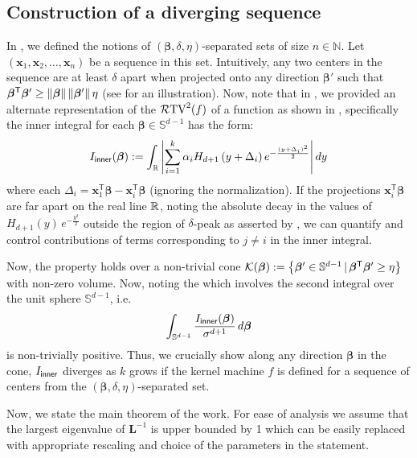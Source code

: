 \subsection{Construction of a diverging sequence}

In , we defined the notions of $(\bm{\beta}, \delta, \eta)$-separated sets of size $n \in \mathbb{N}$. Let $(\bm{x}_1,\bm{x}_2,\ldots,\bm{x}_n)$ be a sequence in this set. Intuitively, any two centers in the sequence are at least $\delta$ apart when projected onto any direction $\bm{\beta}'$ such that $\bm{\beta}^{\mathsf{T}}\bm{\beta}' \ge \norm{\bm{\beta}}\norm{\bm{\beta}'}\eta$ (see  for an illustration). Now, note that in , we provided an alternate representation of the $\rtv{f}$ of a function as shown in , specifically the inner integral for each $\bm{\beta} \in \mathbb{S}^{d-1}$ has the form:
$$I_{\sf{inner}}(\bm{\beta}) := \int_{\mathbb{R}} \left| \sum_{i=1}^k \alpha_i H_{d+1}\left( y + \Delta_i \right) e^{ -\frac{(y + \Delta_i)^2}{2} } \right| dy$$
where each $\Delta_i = \bm{x}_1^\mathsf{T}\bm{\beta} - \bm{x}_i^\mathsf{T}\bm{\beta}$ (ignoring the normalization). If the projections $\bm{x}_i^\mathsf{T}\bm{\beta}$ are far apart on the real line $\reals$, noting the absolute decay in the values of $H_{d+1}\left( y \right) \, e^{ -\frac{y^2}{2} }$ outside the region of $\delta$-peak as asserted by , we can quantify and control contributions of terms corresponding to $j \neq i$ in the inner integral. 

Now, the property holds over a non-trivial cone $\cK(\bm{\beta}) := \curlybracket{\bm{\beta}' \in \mathbb{S}^{d-1}\,|\, \bm{\beta}^{\mathsf{T}}\bm{\beta}' \ge \eta }$ with non-zero volume. Now, noting the  which involves the second integral over the unit sphere $\mathbb{S}^{d-1}$, i.e.
$$\int_{\mathbb{S}^{d-1}} \frac{I_{\sf{inner}}(\bm{\beta})}{\sigma^{d+1}} \, d\bm{\beta}$$
is non-trivially positive. Thus, we crucially show along any direction $\bm{\beta}$ in the cone, $I_{\sf{inner}}$ diverges as $k$ grows if the kernel machine $f$ is defined for a sequence of centers from the $(\bm{\beta}, \delta, \eta)$-separated set.

 Now, we state the main theorem of the work. For ease of analysis we assume that the largest eigenvalue of $\mathbf{L}^{-1}$ is upper bounded by 1 which can be easily replaced with appropriate rescaling and choice of the parameters in the statement. 
 
